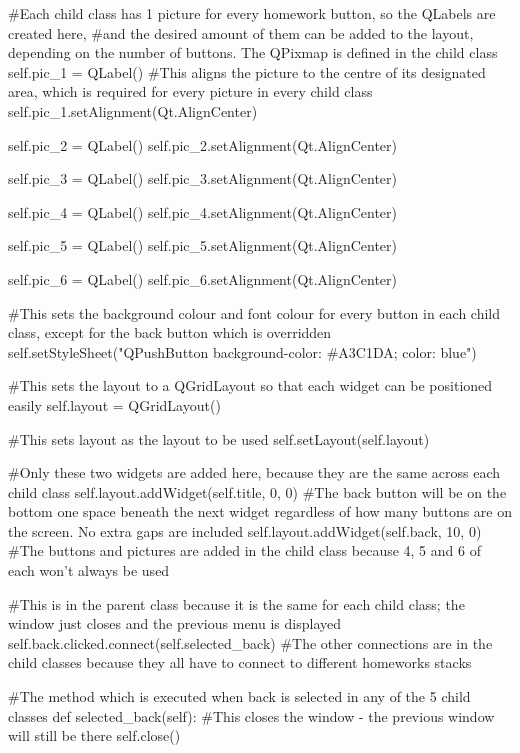 \begin{landscape}
\begin{python}
        #Each child class has 1 picture for every homework button, so the QLabels are created here,
        #and the desired amount of them can be added to the layout, depending on the number of buttons. The QPixmap is defined in the child class
        self.pic_1 = QLabel()
        #This aligns the picture to the centre of its designated area, which is required for every picture in every child class
        self.pic_1.setAlignment(Qt.AlignCenter)

        self.pic_2 = QLabel()
        self.pic_2.setAlignment(Qt.AlignCenter)
        
        self.pic_3 = QLabel()
        self.pic_3.setAlignment(Qt.AlignCenter)
        
        self.pic_4 = QLabel()
        self.pic_4.setAlignment(Qt.AlignCenter)

        self.pic_5 = QLabel()
        self.pic_5.setAlignment(Qt.AlignCenter)
        
        self.pic_6 = QLabel()
        self.pic_6.setAlignment(Qt.AlignCenter)

        #This sets the background colour and font colour for every button in each child class, except for the back button which is overridden
        self.setStyleSheet("QPushButton {background-color: #A3C1DA; color: blue}")   

        #This sets the layout to a QGridLayout so that each widget can be positioned easily
        self.layout = QGridLayout()

        #This sets layout as the layout to be used
        self.setLayout(self.layout)

        #Only these two widgets are added here, because they are the same across each child class
        self.layout.addWidget(self.title, 0, 0)
        #The back button will be on the bottom one space beneath the next widget regardless of how many buttons are on the screen. No extra gaps are included
        self.layout.addWidget(self.back, 10, 0)
        #The buttons and pictures are added in the child class because 4, 5 and 6 of each won't always be used

        #This is in the parent class because it is the same for each child class; the window just closes and the previous menu is displayed
        self.back.clicked.connect(self.selected_back)
        #The other connections are in the child classes because they all have to connect to different homeworks stacks

    #The method which is executed when back is selected in any of the 5 child classes
    def selected_back(self):
        #This closes the window - the previous window will still be there
        self.close()
\end{python}


\end{landscape}
